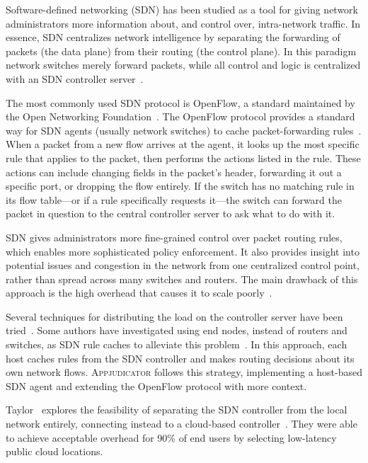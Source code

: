 Software-defined networking (SDN) has been studied as a tool for giving network
administrators more information about, and control over, intra-network traffic.
In essence, SDN centralizes network intelligence by separating the forwarding of
packets (the data plane) from their routing (the control plane). In this
paradigm network switches merely forward packets, while all control and logic is
centralized with an SDN controller server~\cite{kim2013}.

The most commonly used SDN protocol is OpenFlow, a standard maintained by the
Open Networking Foundation~\cite{erickson2011}. The OpenFlow protocol provides a
standard way for SDN agents (usually network switches) to cache
packet-forwarding rules~\cite{openflowspec}. When a packet from a new flow
arrives at the agent, it looks up the most specific rule that applies to the
packet, then performs the actions listed in the rule. These actions can include
changing fields in the packet's header, forwarding it out a specific port, or
dropping the flow entirely. If the switch has no matching rule in its flow
table---or if a rule specifically requests it---the switch can forward the
packet in question to the central controller server to ask what to do with it.

SDN gives administrators more fine-grained control over packet routing rules,
which enables more sophisticated policy enforcement. It also provides insight
into potential issues and congestion in the network from one centralized control
point, rather than spread across many switches and routers. The main drawback of
this approach is the high overhead that causes it to scale
poorly~\cite{benzekki2016}.

Several techniques for distributing the load on the controller server have been
tried~\cite{oktian2017, dixit2013}. Some authors have investigated using end
nodes, instead of routers and switches, as SDN rule caches to alleviate this
problem~\cite{taylor2017, chuluundorj2019}. In this approach, each host caches
rules from the SDN controller and makes routing decisions about its own network
flows. \textsc{Appjudicator} follows this strategy, implementing a host-based
SDN agent and extending the OpenFlow protocol with more context.

Taylor ~\etal explores the feasibility of separating the SDN controller from the
local network entirely, connecting instead to a cloud-based
controller~\cite{taylor2017shue}. They were able to achieve acceptable overhead
for 90\% of end users by selecting low-latency public cloud locations.

